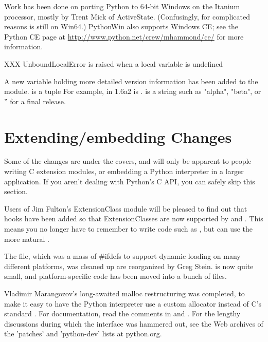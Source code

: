 \documentclass{howto}
\begin{document}
{Work has been done on porting Python to 64-bit Windows on the Itanium
processor, mostly by Trent Mick of ActiveState.  (Confusingly, for
complicated reasons  is still  on
Win64.)  PythonWin also supports Windows CE; see the Python CE page at
\url{http://www.python.net/crew/mhammond/ce/} for more information.

XXX UnboundLocalError is raised when a local variable is undefined

A new variable holding more detailed version information has been
added to the  module.   is a tuple
 For example, in 1.6a2  is
.   is a string such as
"alpha", "beta", or '' for a final release.

\section{Extending/embedding Changes}

Some of the changes are under the covers, and will only be apparent to
people writing C extension modules, or embedding a Python interpreter
in a larger application.  If you aren't dealing with Python's C API,
you can safely skip this section.

Users of Jim Fulton's ExtensionClass module will be pleased to find
out that hooks have been added so that ExtensionClasses are now
supported by  and .
This means you no longer have to remember to write code such as
, but can use the more natural
.

The  file, which was a mass of #ifdefs to
support dynamic loading on many different platforms, was cleaned up
are reorganized by Greg Stein.   is now quite small,
and platform-specific code has been moved into a bunch of
 files.  

Vladimir Marangozov's long-awaited malloc restructuring was completed,
to make it easy to have the Python interpreter use a custom allocator
instead of C's standard .  For documentation, read
the comments in  and
.  For the lengthy discussions during which
the interface was hammered out, see the Web archives of the 'patches'
and 'python-dev' lists at python.org.

}
\end{document}

